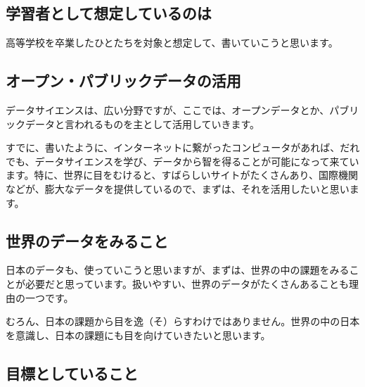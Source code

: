 \documentclass[
  xelatex, ja=standard]{bxjsbook}
\theoremstyle{definition}
\theoremstyle{definition}
\theoremstyle{definition}
\theoremstyle{definition}
\theoremstyle{remark}
\begin{document}
\hypertarget{ux5b66ux7fd2ux8005ux3068ux3057ux3066ux60f3ux5b9aux3057ux3066ux3044ux308bux306eux306f}{%
\subsection{学習者として想定しているのは}\label{ux5b66ux7fd2ux8005ux3068ux3057ux3066ux60f3ux5b9aux3057ux3066ux3044ux308bux306eux306f}}

高等学校を卒業したひとたちを対象と想定して、書いていこうと思います。

\hypertarget{ux30aaux30fcux30d7ux30f3ux30d1ux30d6ux30eaux30c3ux30afux30c7ux30fcux30bfux306eux6d3bux7528}{%
\subsection{オープン・パブリックデータの活用}\label{ux30aaux30fcux30d7ux30f3ux30d1ux30d6ux30eaux30c3ux30afux30c7ux30fcux30bfux306eux6d3bux7528}}

データサイエンスは、広い分野ですが、ここでは、オープンデータとか、パブリックデータと言われるものを主として活用していきます。

すでに、書いたように、インターネットに繋がったコンピュータがあれば、だれでも、データサイエンスを学び、データから智を得ることが可能になって来ています。特に、世界に目をむけると、すばらしいサイトがたくさんあり、国際機関などが、膨大なデータを提供しているので、まずは、それを活用したいと思います。

\hypertarget{ux4e16ux754cux306eux30c7ux30fcux30bfux3092ux307fux308bux3053ux3068}{%
\subsection{世界のデータをみること}\label{ux4e16ux754cux306eux30c7ux30fcux30bfux3092ux307fux308bux3053ux3068}}

日本のデータも、使っていこうと思いますが、まずは、世界の中の課題をみることが必要だと思っています。扱いやすい、世界のデータがたくさんあることも理由の一つです。

むろん、日本の課題から目を逸（そ）らすわけではありません。世界の中の日本を意識し、日本の課題にも目を向けていきたいと思います。

\hypertarget{ux76eeux6a19ux3068ux3057ux3066ux3044ux308bux3053ux3068}{%
\subsection{目標としていること}\label{ux76eeux6a19ux3068ux3057ux3066ux3044ux308bux3053ux3068}}
\end{document}
